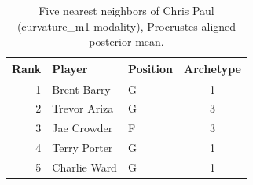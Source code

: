 \begin{table}[htbp]
  \centering\small
  \begin{tabular}{rllc}
    \toprule
    Rank & Player & Position & Archetype \\
    \midrule
    1 & Brent Barry & G & 1 \\
    2 & Trevor Ariza & G & 3 \\
    3 & Jae Crowder & F & 3 \\
    4 & Terry Porter & G & 1 \\
    5 & Charlie Ward & G & 1 \\
    \bottomrule
  \end{tabular}
  \caption{Five nearest neighbors of Chris Paul (curvature_m1 modality), Procrustes-aligned posterior mean.}
  \label{tab:Chris_Paul_neighbors_curvature_m1}
\end{table}

